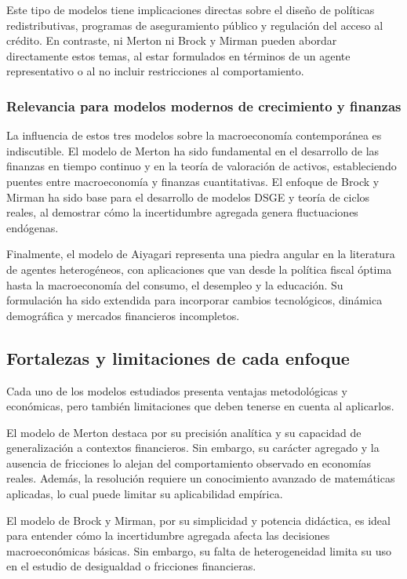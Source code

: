 \documentclass[a4paper,12pt]{article}
\begin{document}
Este tipo de modelos tiene implicaciones directas sobre el diseño de políticas redistributivas, programas de aseguramiento público y regulación del acceso al crédito. En contraste, ni Merton ni Brock y Mirman pueden abordar directamente estos temas, al estar formulados en términos de un agente representativo o al no incluir restricciones al comportamiento.

\subsubsection{Relevancia para modelos modernos de crecimiento y finanzas}

La influencia de estos tres modelos sobre la macroeconomía contemporánea es indiscutible. El modelo de Merton ha sido fundamental en el desarrollo de las finanzas en tiempo continuo y en la teoría de valoración de activos, estableciendo puentes entre macroeconomía y finanzas cuantitativas. El enfoque de Brock y Mirman ha sido base para el desarrollo de modelos DSGE y teoría de ciclos reales, al demostrar cómo la incertidumbre agregada genera fluctuaciones endógenas.

Finalmente, el modelo de Aiyagari representa una piedra angular en la literatura de agentes heterogéneos, con aplicaciones que van desde la política fiscal óptima hasta la macroeconomía del consumo, el desempleo y la educación. Su formulación ha sido extendida para incorporar cambios tecnológicos, dinámica demográfica y mercados financieros incompletos.

\subsection{Fortalezas y limitaciones de cada enfoque}

Cada uno de los modelos estudiados presenta ventajas metodológicas y económicas, pero también limitaciones que deben tenerse en cuenta al aplicarlos.

El modelo de Merton destaca por su precisión analítica y su capacidad de generalización a contextos financieros. Sin embargo, su carácter agregado y la ausencia de fricciones lo alejan del comportamiento observado en economías reales. Además, la resolución requiere un conocimiento avanzado de matemáticas aplicadas, lo cual puede limitar su aplicabilidad empírica.

El modelo de Brock y Mirman, por su simplicidad y potencia didáctica, es ideal para entender cómo la incertidumbre agregada afecta las decisiones macroeconómicas básicas. Sin embargo, su falta de heterogeneidad limita su uso en el estudio de desigualdad o fricciones financieras.
\end{document}
